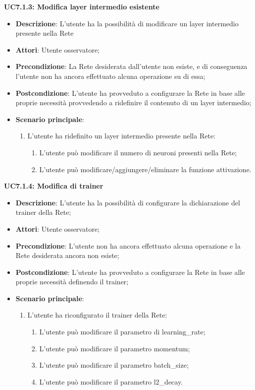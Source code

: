 \textbf{UC7.1.3: Modifica layer intermedio esistente}
\label{UC7.1.3: Modifica layer intermedio esistente}
\noindent
\begin{itemize}
\item \textbf{Descrizione}: L'utente ha la possibilit\`a di modificare un layer intermedio presente nella Rete
\item \textbf{Attori}: Utente osservatore;
\item \textbf{Precondizione}: La Rete desiderata dall'utente non esiste, e di conseguenza l'utente non ha ancora effettuato alcuna operazione su di essa;
\item \textbf{Postcondizione}: L'utente ha provveduto a configurare la Rete in base alle proprie necessit\`a 
provvedendo a ridefinire il contenuto di un layer intermedio;
\item \textbf{Scenario principale}:
\begin{enumerate}
\item L'utente ha ridefinito un layer intermedio presente nella Rete:
\begin{enumerate}
\item L'utente pu\`o modificare il numero di neuroni presenti nella Rete;
\item L'utente pu\`o modificare/aggiungere/eliminare la funzione attivazione.
\end{enumerate}
\end{enumerate}
\end{itemize}


\textbf{UC7.1.4: Modifica di trainer}
\label{UC7.1.4: Modifica di trainer}
\noindent
\begin{itemize}
\item \textbf{Descrizione}: L'utente ha la possibilit\`a di configurare la dichiarazione del trainer della Rete;
\item \textbf{Attori}: Utente osservatore;
\item \textbf{Precondizione}: L'utente non ha ancora effettuato alcuna operazione e la Rete desiderata ancora non esiste;
\item \textbf{Postcondizione}: L'utente ha provveduto a configurare la Rete in base alle proprie necessit\`a definendo il trainer;
\item \textbf{Scenario principale}:
\begin{enumerate}
\item L'utente ha riconfigurato il trainer della Rete:
\begin{enumerate}
\item L'utente pu\`o modificare il parametro di learning\_rate;
\item L'utente pu\`o modificare il parametro momentum;
\item L'utente pu\`o modificare il parametro batch\_size;
\item L'utente pu\`o modificare il parametro l2\_decay.
\end{enumerate}
\end{enumerate}
\end{itemize}

